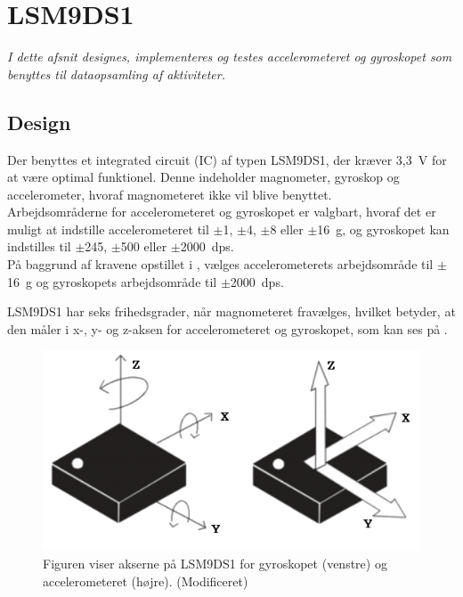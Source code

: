 \section{LSM9DS1}\label{sec_design_LSM9DS1}
\textit{I dette afsnit designes, implementeres og testes accelerometeret og gyroskopet som benyttes til dataopsamling af aktiviteter.}

\subsection{Design} \label{design_lsm}
Der benyttes et integrated circuit (IC) af typen LSM9DS1, der kræver 3,3~V for at være optimal funktionel. Denne indeholder magnometer, gyroskop og accelerometer, hvoraf magnometeret ikke vil blive benyttet. \\ 
Arbejdsområderne for accelerometeret og gyroskopet er valgbart, hvoraf det er muligt at indstille accelerometeret til $\pm$1, $\pm$4, $\pm$8 eller $\pm$16~g, og gyroskopet kan indstilles til $\pm$245, $\pm$500 eller $\pm$2000~dps. \citep{Jimb02016,STMicroelectronics2016} \\
På baggrund af kravene opstillet i , vælges accelerometerets arbejdsområde til $\pm$16~g og gyroskopets arbejdsområde til $\pm$2000~dps. 

LSM9DS1 har seks frihedsgrader, når magnometeret fravælges, hvilket betyder, at den måler i x-, y- og z-aksen for accelerometeret og gyroskopet, som kan ses på . %
\citep{STMicroelectronics2016}\newline 
\begin{figure}[H]
	\centering
	\includegraphics[scale=0.4]{figures/cDesign/LSM9DS1.png}
	\caption{Figuren viser akserne på LSM9DS1 for gyroskopet (venstre) og accelerometeret (højre). \citep{Jimb02016} (Modificeret)}
	\label{vores_IC}
\end{figure}

